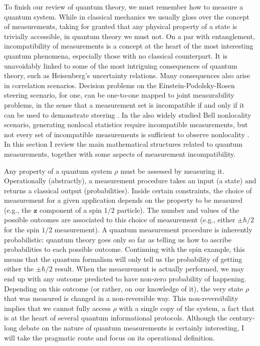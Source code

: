 		To finish our review of quantum theory, we must remember how to measure a quantum system. While in classical mechanics we usually gloss over the concept of measurements, taking for granted that any physical property of a state is trivially accessible, in quantum theory we must not. On a par with entanglement, incompatibility of measurements is a concept at the heart of the most interesting quantum phenomena, especially those with no classical counterpart. It is unavoidably linked to some of the most intriguing consequences of quantum theory, such as Heisenberg's uncertainty relations. Many consequences also arise in correlation scenarios. Decision problems on the Einstein-Podolsky-Rosen steering scenario, for one, can be one-to-one mapped to joint measurability problems, in the sense that a measurement set is incompatible if and only if it can be used to demonstrate steering \cite{quintino_incompatibilitysteering_2014,uola_incompatibilitysteering_2014,uola_onetoonesteering_2015}. In the also widely studied Bell nonlocality scenario, generating nonlocal statistics require incompatible measurements, but not every set of incompatible measurements is sufficient to observe nonlocality \cite{quintino_2016_incompatibilitybell,quintino_2018_incompatibilitybellgeneral,bene_2018_incompatibilitybell}. In this section I review the main mathematical structures related to quantum measurements, together with some aspects of measurement incompatibility.
	
		\ornamentbreak

		Any property of a quantum system $\rho$ must be assessed by measuring it. Operationally (abstractly), a measurement procedure takes an input (a state) and returns a classical output (probabilities). Inside certain constraints, the choice of measurement for a given application depends on the property to be measured (e.g., the $\mathbf{z}$ component of a spin $1/2$ particle). The number and values of the possible outcomes are associated to this choice of measurement (e.g., either $\pm \hbar/2$ for the spin $1/2$ measurement). A quantum measurement procedure is inherently probabilistic: quantum theory goes only so far as telling us how to ascribe probabilities to each possible outcome. Continuing with the spin example, this means that the quantum formalism will only tell us the probability of getting either the $\pm \hbar/2$ result. When the measurement is actually performed, we may end up with any outcome predicted to have non-zero probability of happening. Depending on this outcome (or rather, on our knowledge of it), the very state $\rho$ that was measured is changed in a non-reversible way. This non-reversibility implies that we cannot fully access $\rho$ with a single copy of the system, a fact that is at the heart of several quantum informational protocols. Although the century-long debate on the nature of quantum measurements is certainly interesting, I will take the pragmatic route and focus on its operational definition.
		
